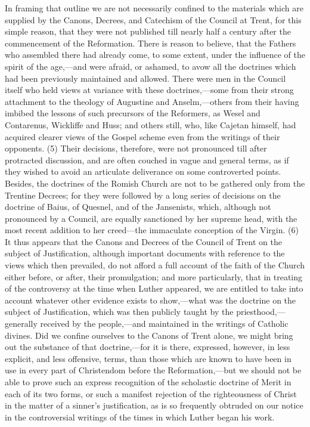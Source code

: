 \documentclass[
]{book}
\begin{document}
In framing that outline we are not necessarily confined to the materials which are supplied by the Canons, Decrees, and Catechism of the Council at Trent, for this simple reason, that they were not published till nearly half a century after the commencement of the Reformation. There is reason to believe, that the Fathers who assembled there had already come, to some extent, under the influence of the spirit of the age,---and were afraid, or ashamed, to avow all the doctrines which had been previously maintained and allowed. There were men in the Council itself who held views at variance with these doctrines,---some from their strong attachment to the theology of Augustine and Anselm,---others from their having imbibed the lessons of such precursors of the Reformers, as Wesel and Contarenus, Wickliffe and Huss; and others still, who, like Cajetan himself, had acquired clearer views of the Gospel scheme even from the writings of their opponents. (5) Their decisions, therefore, were not pronounced till after protracted discussion, and are often couched in vague and general terms, as if they wished to avoid an articulate deliverance on some controverted points. Besides, the doctrines of the Romish Church are not to be gathered only from the Trentine Decrees; for they were followed by a long series of decisions on the doctrine of Baius, of Quesnel, and of the Jansenists, which, although not pronounced by a Council, are equally sanctioned by her supreme head, with the most recent addition to her creed---the immaculate conception of the Virgin. (6) It thus appears that the Canons and Decrees of the Council of Trent on the subject of Justification, although important documents with reference to the views which then prevailed, do not afford a full account of the faith of the Church either before, or after, their promulgation; and more particularly, that in treating of the controversy at the time when Luther appeared, we are entitled to take into account whatever other evidence exists to show,---what was the doctrine on the subject of Justification, which was then publicly taught by the priesthood,---generally received by the people,---and maintained in the writings of Catholic divines. Did we confine ourselves to the Canons of Trent alone, we might bring out the substance of that doctrine,---for it is there, expressed, however, in less explicit, and less offensive, terms, than those which are known to have been in use in every part of Christendom before the Reformation,---but we should not be able to prove such an express recognition of the scholastic doctrine of Merit in each of its two forms, or such a manifest rejection of the righteousness of Christ in the matter of a sinner's justification, as is so frequently obtruded on our notice in the controversial writings of the times in which Luther began his work.
\end{document}
